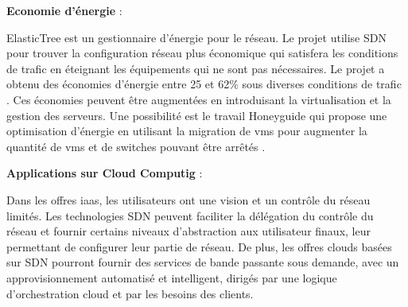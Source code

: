\textbf{Economie d'énergie} : 

ElasticTree est un gestionnaire d'énergie pour le réseau. Le projet utilise SDN pour trouver la configuration réseau plus économique qui satisfera les conditions de trafic en éteignant les équipements qui ne sont pas nécessaires. Le projet a obtenu des économies d'énergie entre 25 et 62\% sous diverses conditions de trafic \cite{Elastictree}. Ces économies peuvent être augmentées en introduisant la virtualisation et la gestion des serveurs. Une possibilité est le travail Honeyguide qui propose une optimisation d'énergie en utilisant la migration de \glspl{vm} pour augmenter la quantité de \glspl{vm} et de switches pouvant être arrêtés \cite{Honeyguide}.




\textbf{Applications sur Cloud Computig} : 

Dans les offres \gls{iaas}, les utilisateurs ont une vision et un contrôle du réseau  limités. Les technologies SDN peuvent faciliter la délégation du contrôle du réseau et fournir certains niveaux d'abstraction aux utilisateur finaux, leur permettant de configurer leur partie de réseau. De plus, les offres clouds basées sur SDN pourront fournir des services de bande passante sous demande, avec un approvisionnement automatisé et intelligent, dirigés par une logique d'orchestration cloud et par les besoins des clients. \cite{AdoptionResearchTrendsCloud}


